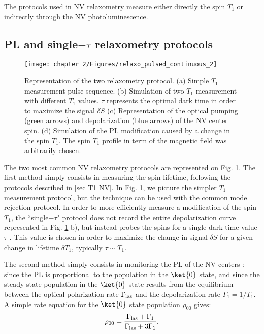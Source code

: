 \documentclass[a4paper, 11pt]{book}
\begin{document}
The protocols used in NV relaxometry measure either directly the spin $T_1$ or indirectly through the NV photoluminescence.

\subsection{PL and single$-\tau$ relaxometry protocols}
\begin{figure}[h]
\centering
\texttt{[image: chapter 2/Figures/relaxo\_pulsed\_continuous\_2]}
\caption{Representation of the two relaxometry protocol. (a) Simple $T_1$ measurement pulse sequence. (b) Simulation of two $T_1$ measurement with different $T_1$ values. $\tau$ represents the optimal dark time in order to maximize the signal $\delta S$ (c) Representation of the optical pumping (green arrows) and depolarization (blue arrows) of the NV center spin. (d) Simulation of the PL modification caused by a change in the spin $T_1$. The spin $T_1$ profile in term of the magnetic field was arbitrarily chosen.}
\label{T1 vs PL}
\end{figure}

The two most common NV relaxometry protocols are represented on Fig. \ref{T1 vs PL}. The first method simply consists in measuring the spin lifetime, following the protocols described in \ref{sec T1 NV}. In Fig. \ref{T1 vs PL}, we picture the simpler $T_1$ measurement protocol, but the technique can be used with the common mode rejection protocol. In order to more efficiently measure a modification of the spin $T_1$, the ``single$-\tau$" protocol does not record the entire depolarization curve represented in Fig. \ref{T1 vs PL}-b), but instead probes the spins for a single dark time value $\tau$ \citep{pelliccione2014two, schmid2015relaxometry, tetienne2016scanning}. This value is chosen in order to maximize the change in signal $\delta S$ for a given change in lifetime $\delta T_1$, typically $\tau \sim T_1$.

 The second method simply consists in monitoring the PL of the NV centers : since the PL is proportional to the population in the $\ket{0}$ state, and since the steady state population in the $\ket{0}$ state results from the equilibrium between the optical polarization rate $\Gamma_{\rm las}$ and the depolarization rate $\Gamma_1=1/T_1$. A simple rate equation for the $\ket{0}$ state population $\rho_{00}$ gives:
 \begin{equation}
 \rho_{00}=\frac{\Gamma_{\rm las}+\Gamma_1}{\Gamma_{\rm las}+3\Gamma_1}.
 \end{equation}
 
\end{document}
